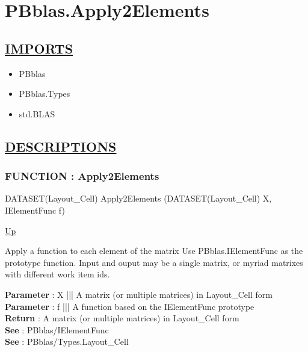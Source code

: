 \chapter*{PBblas.Apply2Elements}
\hypertarget{ecldoc:toc:PBblas.Apply2Elements}{}

\section*{\underline{IMPORTS}}
\begin{itemize}
\item PBblas
\item PBblas.Types
\item std.BLAS
\end{itemize}

\section*{\underline{DESCRIPTIONS}}
\subsection*{FUNCTION : Apply2Elements}
\hypertarget{ecldoc:pbblas.apply2elements}{}
\begin{minipage}[t]{\textwidth}
\begin{flushleft}
DATASET(Layout\_Cell) Apply2Elements (DATASET(Layout\_Cell) X, IElementFunc f)
\end{flushleft}
\end{minipage}
\hyperlink{ecldoc:toc:PBblas}{Up}

\par
Apply a function to each element of the matrix Use PBblas.IElementFunc as the prototype function. Input and ouput may be a single matrix, or myriad matrixes with different work item ids.
\par
\textbf{Parameter} : X ||| A matrix (or multiple matrices) in Layout\_Cell form \\
\textbf{Parameter} : f ||| A function based on the IElementFunc prototype \\
\textbf{Return} : A matrix (or multiple matrices) in Layout\_Cell form \\
\textbf{See} : PBblas/IElementFunc \\
\textbf{See} : PBblas/Types.Layout\_Cell \\
